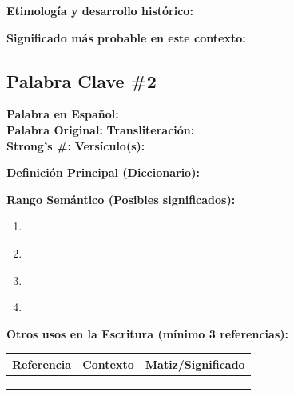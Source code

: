 \documentclass[11pt,a4paper]{article}
\begin{document}
\vspace{0.5cm}

\textbf{Etimología y desarrollo histórico:}
\vspace{2cm}

\textbf{Significado más probable en este contexto:}
\vspace{2cm}

\newpage

\subsection{Palabra Clave \#2}

\begin{lexiconbox}
\textbf{Palabra en Español:} \underline{\hspace{8cm}}\\[0.5cm]
\textbf{Palabra Original:} \underline{\hspace{4cm}} \quad \textbf{Transliteración:} \underline{\hspace{4cm}}\\[0.5cm]
\textbf{Strong's \#:} \underline{\hspace{3cm}} \quad \textbf{Versículo(s):} \underline{\hspace{5cm}}
\end{lexiconbox}

\textbf{Definición Principal (Diccionario):}
\vspace{2cm}

\textbf{Rango Semántico (Posibles significados):}
\begin{enumerate}[leftmargin=1cm]
    \item \underline{\hspace{12cm}}
    \item \underline{\hspace{12cm}}
    \item \underline{\hspace{12cm}}
    \item \underline{\hspace{12cm}}
\end{enumerate}

\textbf{Otros usos en la Escritura (mínimo 3 referencias):}

\vspace{0.5cm}

\begin{tabularx}{\textwidth}{|L{2.5cm}|L{5.5cm}|X|}
\hline
\textbf{Referencia} & \textbf{Contexto} & \textbf{Matiz/Significado} \\
\hline
\vspace{1.5cm} & \vspace{1.5cm} & \vspace{1.5cm} \\
\hline
\vspace{1.5cm} & \vspace{1.5cm} & \vspace{1.5cm} \\
\hline
\vspace{1.5cm} & \vspace{1.5cm} & \vspace{1.5cm} \\
\hline
\end{tabularx}
\end{document}
